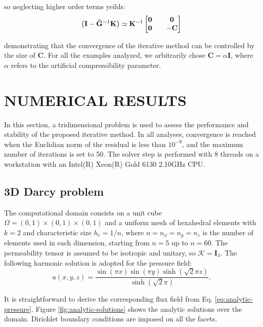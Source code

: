 \documentclass{wccm2024}
\begin{document}
\noindent so neglecting higher order terms yeilds:
\vskip -0.3cm
\begin{equation}
    \left( \mathbf{I} - \mathbf{\Tilde{G}}^{-1} \mathbf{K} \right) \simeq \mathbf{K}^{-1}
    \begin{bmatrix}
        \mathbf{0} && \mathbf{0} \\
        \mathbf{0} && -\mathbf{C}
    \end{bmatrix}
\end{equation}

\noindent demonstrating that the convergence of the iterative method can be controlled by the size of $\mathbf{C}$. For all the examples analyzed, we arbitrarily chose $\mathbf{C}=\alpha \mathbf{I}$, where $\alpha$ refers to the artificial compressibility parameter.

\section{NUMERICAL RESULTS}

In this section, a tridimensional problem is used to assess the performance and stability of the proposed iterative method. In all analyses, convergence is reached when the Euclidian norm of the residual is less than $10^{-9}$, and the maximum number of iterations is set to 50. The solver step is performed with 8 threads on a workstation with an Intel(R) Xeon(R) Gold 6130 2.10GHz CPU.

\subsection{3D Darcy problem}

The computational domain consists on a unit cube $\Omega=(0,1)\times(0,1)\times(0,1)$ and a uniform mesh of hexahedral elements with $k=2$ and characteristic size $h_e=1/n$, where $n=n_x=n_y=n_z$ is the number of elements used in each dimension, starting from $n=5$ up to $n=60$.  The permeability tensor is assumed to be isotropic and unitary, so $\mathcal{K}=\mathbf{I}_3$. The following harmonic solution is adopted for the pressure field:
\vskip -0.3cm
\begin{equation} \label{eq:analytic-pressure}
    u(x,y,z) = \frac{\sin(\pi x) \sin(\pi y) \sinh(\sqrt{2}\pi z)}{\sinh(\sqrt{2}\pi)} \text{.}
\end{equation}

It is straightforward to derive the corresponding flux field from Eq. \eqref{eq:analytic-pressure}. Figure \ref{fig:analytic-solutions} shows the analytic solutions over the domain. Dirichlet boundary conditions are imposed on all the facets.
\end{document}
